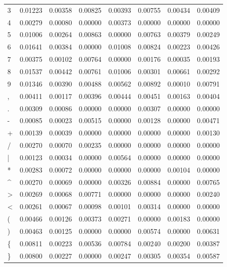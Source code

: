 \begin{tabularx}{\textwidth}{X|c|c|c|c|c|c|c}
3   & 0.01223 &  0.00358 &  0.00825 &  0.00393 &  0.00755 &  0.00434 &  0.00409  \\
4   & 0.00279 &  0.00080 &  0.00000 &  0.00373 &  0.00000 &  0.00000 &  0.00000  \\
5   & 0.01006 &  0.00264 &  0.00863 &  0.00000 &  0.00763 &  0.00379 &  0.00249  \\
6   & 0.01641 &  0.00384 &  0.00000 &  0.01008 &  0.00824 &  0.00223 &  0.00426  \\
7   & 0.00375 &  0.00102 &  0.00764 &  0.00000 &  0.00176 &  0.00035 &  0.00193  \\
8   & 0.01537 &  0.00442 &  0.00761 &  0.01006 &  0.00301 &  0.00661 &  0.00292  \\
9   & 0.01346 &  0.00390 &  0.00488 &  0.00562 &  0.00892 &  0.00010 &  0.00791  \\
,   & 0.00411 &  0.00117 &  0.00396 &  0.00444 &  0.00451 &  0.00163 &  0.00404  \\
.   & 0.00309 &  0.00086 &  0.00000 &  0.00000 &  0.00307 &  0.00000 &  0.00000  \\
-   & 0.00085 &  0.00023 &  0.00515 &  0.00000 &  0.00128 &  0.00000 &  0.00471  \\
+   & 0.00139 &  0.00039 &  0.00000 &  0.00000 &  0.00000 &  0.00000 &  0.00130  \\
/   & 0.00270 &  0.00070 &  0.00235 &  0.00000 &  0.00000 &  0.00000 &  0.00000  \\
|   & 0.00123 &  0.00034 &  0.00000 &  0.00564 &  0.00000 &  0.00000 &  0.00000  \\
*   & 0.00283 &  0.00072 &  0.00000 &  0.00000 &  0.00000 &  0.00104 &  0.00000  \\
\^{}& 0.00270 &  0.00069 &  0.00000 &  0.00326 &  0.00884 &  0.00000 &  0.00765  \\
>   & 0.00269 &  0.00068 &  0.00771 &  0.00000 &  0.00000 &  0.00000 &  0.00240  \\
<   & 0.00261 &  0.00067 &  0.00098 &  0.00101 &  0.00314 &  0.00000 &  0.00000  \\
(   & 0.00466 &  0.00126 &  0.00373 &  0.00271 &  0.00000 &  0.00183 &  0.00000  \\
)   & 0.00463 &  0.00125 &  0.00000 &  0.00000 &  0.00574 &  0.00000 &  0.00631  \\
\{  & 0.00811 &  0.00223 &  0.00536 &  0.00784 &  0.00240 &  0.00200 &  0.00387  \\
\}  & 0.00800 &  0.00227 &  0.00000 &  0.00247 &  0.00305 &  0.00354 &  0.00587  \\

\end{tabularx}
